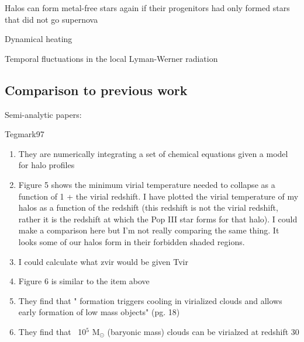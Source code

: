\documentclass[a4paper,fleqn,usenatbib]{mnras}
\begin{document}
\li Halos can form metal-free stars again if their progenitors had
only formed stars that did not go supernova

\li Dynamical heating \citep{Yoshida03}

\li Temporal fluctuations in the local Lyman-Werner radiation

\subsection{Comparison to previous work}

\li Semi-analytic papers: \citep{Tegmark97, Trenti09, Visbal18,
  Mebane18, Griffen18}

\li Tegmark97
\begin{enumerate}
	\item They are numerically integrating a set of chemical equations given a model for halo profiles
	\item Figure 5 shows the minimum virial temperature needed to collapse as a function of 1 + the virial redshift. I have plotted the virial temperature of my halos as a function of the redshift (this redshift is not the virial redshift, rather it is the redshift at which the Pop III star forms for that halo). I could make a comparison here but I'm not really comparing the same thing. It looks some of our halos form in their forbidden shaded regions.
	\item I could calculate what zvir would be given Tvir
	\item Figure 6 is similar to the item above
	\item They find that "\hh{} formation triggers cooling in virialized clouds and allows early formation of low mass objects" (pg. 18)
	\item They find that ~10$^{5}$ M$_{\odot}$ (baryonic mass) clouds can be virialzed at redshift 30
\end{enumerate}
\end{document}
